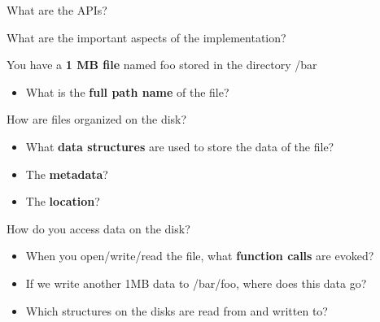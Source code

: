 \begin{slide}


    What are the APIs?
    \bigskip

    What are the important aspects of the implementation?

\end{slide}

\begin{slide}


    You have a \textbf{1 MB file} named foo stored in the directory /bar
    \begin{itemize}
        \item What is the \textbf{full path name} of the file?
    \end{itemize}
    \bigskip

    How are files organized on the disk? 
    \begin{itemize}
        \item What \textbf{data structures} are used to store the data of the file?
        \item The \textbf{metadata}?
        \item The \textbf{location}?
    \end{itemize}
    \bigskip

    How do you access data on the disk?
    \begin{itemize}
        \item When you open/write/read the file, what \textbf{function calls} are evoked?
        \item If we write another 1MB data to /bar/foo, where does this data go?
        \item Which structures on the disks are read from and written to?
    \end{itemize}

\end{slide}

